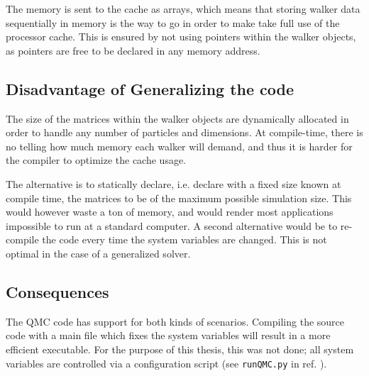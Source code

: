 The memory is sent to the cache as arrays, which means that storing walker data sequentially in memory is the way to go in order to make take full use of the processor cache. This is ensured by not using pointers within the walker objects, as pointers are free to be declared in any memory address.

\subsection{Disadvantage of Generalizing the code}

The size of the matrices within the walker objects are dynamically allocated in order to handle any number of particles and dimensions. At compile-time, there is no telling how much memory each walker will demand, and thus it is harder for the compiler to optimize the cache usage.

The alternative is to statically declare, i.e. declare with a fixed size known at compile time, the matrices to be of the maximum possible simulation size. This would however waste a ton of memory, and would render most applications impossible to run at a standard computer. A second alternative would be to re-compile the code every time the system variables are changed. This is not optimal in the case of a generalized solver.

\subsection{Consequences}

The QMC code has support for both kinds of scenarios. Compiling the source code with a main file which fixes the system variables will result in a more efficient executable. For the purpose of this thesis, this was not done; all system variables are controlled via a configuration script (see \verb+runQMC.py+ in ref. \cite{libBorealisCode}).







